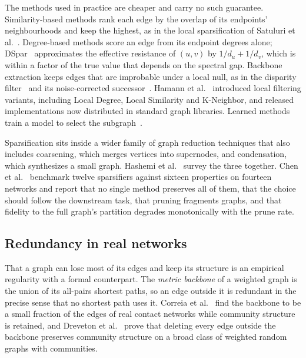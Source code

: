 The methods used in practice are cheaper and carry no such guarantee.
Similarity-based methods rank each edge by the overlap of its endpoints'
neighbourhoods and keep the highest, as in the local sparsification of Satuluri
et al.~\cite{satuluri2011local}. Degree-based methods score an edge from its
endpoint degrees alone; DSpar~\cite{liu2023dspar} approximates the effective
resistance of $(u,v)$ by $1/d_u + 1/d_v$, which is within a factor of the true
value that depends on the spectral gap. Backbone extraction keeps edges that are
improbable under a local null, as in the disparity
filter~\cite{serrano2009extracting} and its noise-corrected
successor~\cite{coscia2017backboning}. Hamann et al.~\cite{hamann2016structure}
introduced local filtering variants, including Local Degree, Local Similarity and
K-Neighbor, and released implementations now distributed in standard graph
libraries. Learned methods train a model to select the
subgraph~\cite{wu2020gsgan}.

Sparsification sits inside a wider family of graph reduction techniques that also
includes coarsening, which merges vertices into supernodes, and condensation,
which synthesizes a small graph. Hashemi et al.~\cite{hashemi2024survey} survey
the three together. Chen et al.~\cite{chen2024demystifying} benchmark twelve
sparsifiers against sixteen properties on fourteen networks and report that no
single method preserves all of them, that the choice should follow the downstream
task, that pruning fragments graphs, and that fidelity to the full graph's
partition degrades monotonically with the prune rate.

\subsection{Redundancy in real networks}\label{sec:background:redundancy}

That a graph can lose most of its edges and keep its structure is an empirical
regularity with a formal counterpart. The \emph{metric backbone} of a weighted
graph is the union of its all-pairs shortest paths, so an edge outside it is
redundant in the precise sense that no shortest path uses it. Correia et
al.~\cite{correia2023contact} find the backbone to be a small fraction of the
edges of real contact networks while community structure is retained, and
Dreveton et al.~\cite{dreveton2024metric} prove that deleting every edge outside
the backbone preserves community structure on a broad class of weighted random
graphs with communities.

